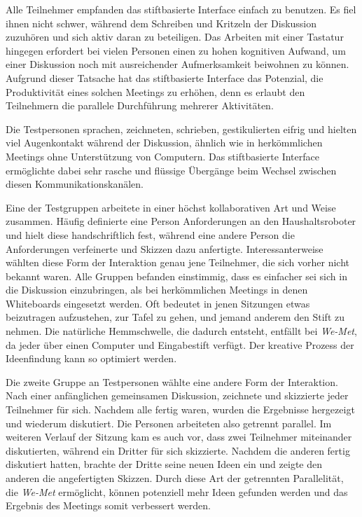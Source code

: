 \medskip Alle Teilnehmer empfanden das stiftbasierte Interface einfach zu benutzen. Es fiel ihnen nicht schwer, während dem Schreiben und Kritzeln der Diskussion zuzuhören und sich aktiv daran zu beteiligen. Das Arbeiten mit einer Tastatur hingegen erfordert bei vielen Personen einen zu hohen kognitiven Aufwand, um einer Diskussion noch mit ausreichender Aufmerksamkeit beiwohnen zu können. Aufgrund dieser Tatsache hat das stiftbasierte Interface das Potenzial, die Produktivität eines solchen Meetings zu erhöhen, denn es erlaubt den Teilnehmern die parallele Durchführung mehrerer Aktivitäten.
	
\medskip Die Testpersonen sprachen, zeichneten, schrieben, gestikulierten eifrig und hielten viel Augenkontakt während der Diskussion, ähnlich wie in herkömmlichen Meetings ohne Unterstützung von Computern. Das stiftbasierte Interface ermöglichte dabei sehr rasche und flüssige Übergänge beim Wechsel zwischen diesen Kommunikationskanälen.
	
\medskip Eine der Testgruppen arbeitete in einer höchst kollaborativen Art und Weise zusammen. Häufig definierte eine Person Anforderungen an den Haushaltsroboter und hielt diese handschriftlich fest, während eine andere Person die Anforderungen verfeinerte und Skizzen dazu anfertigte. Interessanterweise wählten diese Form der Interaktion genau jene Teilnehmer, die sich vorher nicht bekannt waren. Alle Gruppen befanden einstimmig, dass es einfacher sei sich in die Diskussion einzubringen, als bei herkömmlichen Meetings in denen Whiteboards eingesetzt werden. Oft bedeutet in jenen Sitzungen etwas beizutragen aufzustehen, zur Tafel zu gehen, und jemand anderem den Stift zu nehmen. Die natürliche Hemmschwelle, die dadurch entsteht, entfällt bei \emph{We-Met}, da jeder über einen Computer und Eingabestift verfügt. Der kreative Prozess der Ideenfindung kann so optimiert werden.
	
\medskip Die zweite Gruppe an Testpersonen wählte eine andere Form der Interaktion. Nach einer anfänglichen gemeinsamen Diskussion, zeichnete und skizzierte jeder Teilnehmer für sich. Nachdem alle fertig waren, wurden die Ergebnisse hergezeigt und wiederum diskutiert. Die Personen arbeiteten also getrennt parallel. Im weiteren Verlauf der Sitzung kam es auch vor, dass zwei Teilnehmer miteinander diskutierten, während ein Dritter für sich skizzierte. Nachdem die anderen fertig diskutiert hatten, brachte der Dritte seine neuen Ideen ein und zeigte den anderen die angefertigten Skizzen. Durch diese Art der getrennten Parallelität, die \emph{We-Met} ermöglicht, können potenziell mehr Ideen gefunden werden und das Ergebnis des Meetings somit verbessert werden.
	
